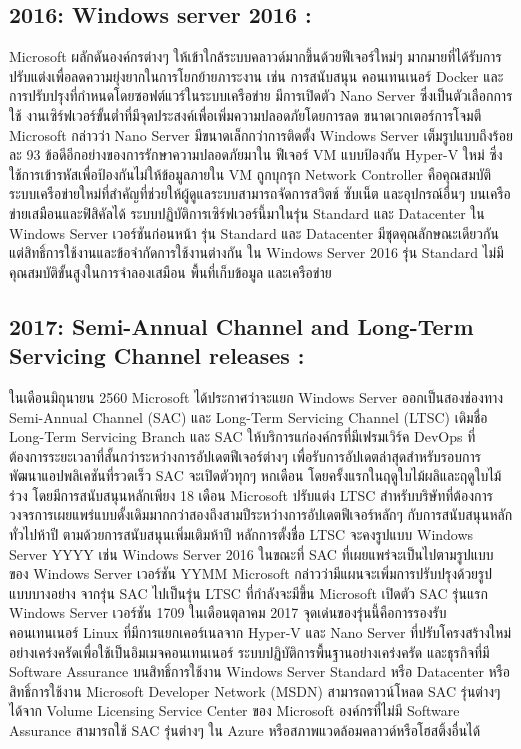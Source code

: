 \hspace{0cm}\subsection{2016: Windows server 2016 :}Microsoft ผลักดันองค์กรต่างๆ ให้เข้าใกล้ระบบคลาวด์มากขึ้นด้วยฟีเจอร์ใหม่ๆ มากมายที่ได้รับการปรับแต่งเพื่อลดความยุ่งยากในการโยกย้ายภาระงาน เช่น การสนับสนุน  คอนเทนเนอร์ Docker  และการปรับปรุงที่กำหนดโดยซอฟต์แวร์ในระบบเครือข่าย มีการเปิดตัว  Nano Server ซึ่งเป็นตัวเลือกการใช้ งานเซิร์ฟเวอร์ขั้นต่ำที่มีจุดประสงค์เพื่อเพิ่มความปลอดภัยโดยการลด  ขนาดเวกเตอร์การโจมตี Microsoft กล่าวว่า Nano Server มีขนาดเล็กกว่าการติดตั้ง Windows Server เต็มรูปแบบถึงร้อยละ 93  ข้อดีอีกอย่างของการรักษาความปลอดภัยมาใน ฟีเจอร์ VM แบบป้องกัน Hyper-V ใหม่ ซึ่งใช้การเข้ารหัสเพื่อป้องกันไม่ให้ข้อมูลภายใน VM ถูกบุกรุก  Network Controller คือคุณสมบัติระบบเครือข่ายใหม่ที่สำคัญที่ช่วยให้ผู้ดูแลระบบสามารถจัดการสวิตช์  ซับเน็ต  และอุปกรณ์อื่นๆ บนเครือข่ายเสมือนและฟิสิคัลได้ ระบบปฏิบัติการเซิร์ฟเวอร์นี้มาในรุ่น Standard และ Datacenter ใน Windows Server เวอร์ชันก่อนหน้า รุ่น Standard และ Datacenter มีชุดคุณลักษณะเดียวกัน แต่สิทธิ์การใช้งานและข้อจำกัดการใช้งานต่างกัน ใน Windows Server 2016 รุ่น Standard ไม่มีคุณสมบัติขั้นสูงในการจำลองเสมือน พื้นที่เก็บข้อมูล และเครือข่าย  

\hspace{0cm}\subsection{2017: Semi-Annual Channel and Long-Term Servicing Channel releases :}ในเดือนมิถุนายน 2560 Microsoft ได้ประกาศว่าจะแยก Windows Server ออกเป็นสองช่องทาง Semi-Annual Channel (SAC) และ Long-Term Servicing Channel (LTSC) เดิมชื่อ Long-Term Servicing Branch  และ SAC ให้บริการแก่องค์กรที่มีเฟรมเวิร์ค DevOps ที่ต้องการระยะเวลาที่สั้นกว่าระหว่างการอัปเดตฟีเจอร์ต่างๆ เพื่อรับการอัปเดตล่าสุดสำหรับรอบการพัฒนาแอปพลิเคชันที่รวดเร็ว SAC จะเปิดตัวทุกๆ หกเดือน โดยครั้งแรกในฤดูใบไม้ผลิและฤดูใบไม้ร่วง โดยมีการสนับสนุนหลักเพียง 18 เดือน Microsoft ปรับแต่ง LTSC สำหรับบริษัทที่ต้องการวงจรการเผยแพร่แบบดั้งเดิมมากกว่าสองถึงสามปีระหว่างการอัปเดตฟีเจอร์หลักๆ กับการสนับสนุนหลักทั่วไปห้าปี ตามด้วยการสนับสนุนเพิ่มเติมห้าปี หลักการตั้งชื่อ LTSC จะคงรูปแบบ Windows Server YYYY เช่น Windows Server 2016 ในขณะที่ SAC ที่เผยแพร่จะเป็นไปตามรูปแบบของ Windows Server เวอร์ชัน YYMM Microsoft กล่าวว่ามีแผนจะเพิ่มการปรับปรุงด้วยรูปแบบบางอย่าง จากรุ่น SAC ไปเป็นรุ่น LTSC ที่กำลังจะมีขึ้น Microsoft เปิดตัว SAC รุ่นแรก Windows Server เวอร์ชัน 1709 ในเดือนตุลาคม 2017 จุดเด่นของรุ่นนี้คือการรองรับ คอนเทนเนอร์ Linux ที่มีการแยกเคอร์เนลจาก Hyper-V และ Nano Server ที่ปรับโครงสร้างใหม่อย่างเคร่งครัดเพื่อใช้เป็นอิมเมจคอนเทนเนอร์ ระบบปฏิบัติการพื้นฐานอย่างเคร่งครัด และธุรกิจที่มี Software Assurance บนสิทธิ์การใช้งาน Windows Server Standard หรือ Datacenter หรือสิทธิ์การใช้งาน Microsoft Developer Network (MSDN) สามารถดาวน์โหลด SAC รุ่นต่างๆ ได้จาก Volume Licensing Service Center ของ Microsoft องค์กรที่ไม่มี Software Assurance สามารถใช้ SAC รุ่นต่างๆ ใน Azure หรือสภาพแวดล้อมคลาวด์หรือโฮสติ้งอื่นได้  

